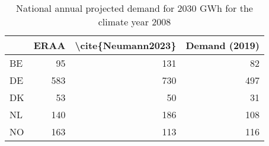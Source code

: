 \begin{table}
\centering
\caption{National annual projected demand for 2030  GWh for the climate year 2008}
\begin{tabular}{lrrr}
\toprule
{} &  ERAA &  \textbackslash cite\{Neumann2023\} &  Demand (2019) \\
\midrule
BE &    95 &                 131 &             82 \\
DE &   583 &                 730 &            497 \\
DK &    53 &                  50 &             31 \\
NL &   140 &                 186 &            108 \\
NO &   163 &                 113 &            116 \\
\bottomrule
\end{tabular}
\end{table}
